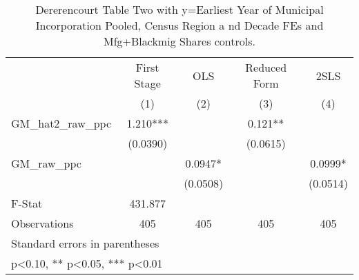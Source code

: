 \begin{table}[htbp]\centering
\def\sym#1{\ifmmode^{#1}\else\(^{#1}\)\fi}
\caption{Dererencourt Table Two with y=Earliest Year of Municipal Incorporation  Pooled, Census Region a nd Decade FEs and Mfg+Blackmig Shares controls.}
\begin{tabular}{l*{4}{c}}
\toprule
                    & First Stage   &         OLS   &Reduced Form   &        2SLS   \\
                    &\multicolumn{1}{c}{(1)}   &\multicolumn{1}{c}{(2)}   &\multicolumn{1}{c}{(3)}   &\multicolumn{1}{c}{(4)}   \\
\midrule
GM\_hat2\_raw\_ppc     &       1.210***&               &       0.121** &               \\
                    &    (0.0390)   &               &    (0.0615)   &               \\
\addlinespace
GM\_raw\_ppc          &               &      0.0947*  &               &      0.0999*  \\
                    &               &    (0.0508)   &               &    (0.0514)   \\
\midrule
F-Stat              &     431.877   &               &               &               \\
Observations        &         405   &         405   &         405   &         405   \\
\bottomrule
\multicolumn{5}{l}{\footnotesize Standard errors in parentheses}\\
\multicolumn{5}{l}{\footnotesize * p<0.10, ** p<0.05, *** p<0.01}\\
\end{tabular}
\end{table}
